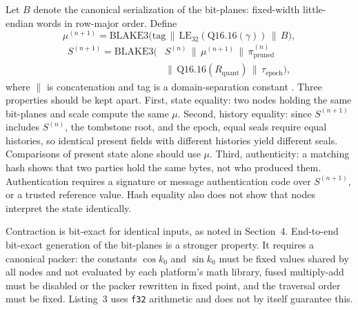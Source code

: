 \documentclass[10pt, twocolumn, a4paper]{article}
\begin{document}
Let $B$ denote the canonical serialization of the bit-planes: fixed-width little-endian words in row-major order. Define
\begin{equation}
\mu^{(n+1)}=\text{BLAKE3}\big(\text{tag}\,\|\,\text{LE}_{32}(\text{Q16.16}(\gamma))\,\|\,B\big),
\end{equation}
\begin{equation}
\begin{split}S^{(n+1)}=\text{BLAKE3}\big(&S^{(n)}\,\|\,\mu^{(n+1)}\,\|\,\pi_{\text{pruned}}^{(n)}\\ &\|\,\text{Q16.16}(R_{\text{quant}})\,\|\,\tau_{\text{epoch}}\big),\end{split}
\end{equation}
where $\|$ is concatenation and tag is a domain-separation constant \cite{blake3}. Three properties should be kept apart. First, state equality: two nodes holding the same bit-planes and scale compute the same $\mu$. Second, history equality: since $S^{(n+1)}$ includes $S^{(n)}$, the tombstone root, and the epoch, equal seals require equal histories, so identical present fields with different histories yield different seals. Comparisons of present state alone should use $\mu$. Third, authenticity: a matching hash shows that two parties hold the same bytes, not who produced them. Authentication requires a signature or message authentication code over $S^{(n+1)}$, or a trusted reference value. Hash equality also does not show that nodes interpret the state identically.

Contraction is bit-exact for identical inputs, as noted in Section~4. End-to-end bit-exact generation of the bit-planes is a stronger property. It requires a canonical packer: the constants $\cos k_0$ and $\sin k_0$ must be fixed values shared by all nodes and not evaluated by each platform's math library, fused multiply-add must be disabled or the packer rewritten in fixed point, and the traversal order must be fixed. Listing~3 uses \texttt{f32} arithmetic and does not by itself guarantee this.
\end{document}

